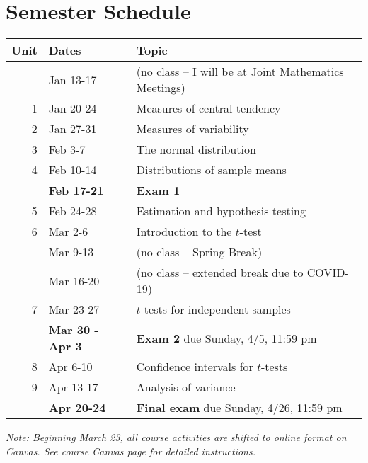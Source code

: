 \documentclass[10pt]{article}
\begin{document}
\section*{Semester Schedule}
\label{sec:orgac6aa8f}
\begin{center}
\begin{tabular}{rll}
Unit & Dates & Topic\\
\hline
 & Jan 13-17 & (no class -- I will be at Joint Mathematics Meetings)\\
1 & Jan 20-24 & Measures of central tendency\\
2 & Jan 27-31 & Measures of variability\\
3 & Feb 3-7 & The normal distribution\\
4 & Feb 10-14 & Distributions of sample means\\
 & \textbf{Feb 17-21} & \textbf{Exam 1}\\
5 & Feb 24-28 & Estimation and hypothesis testing\\
6 & Mar 2-6 & Introduction to the \(t\)-test\\
 & Mar 9-13 & (no class -- Spring Break)\\
 & Mar 16-20 & (no class -- extended break due to COVID-19)\\
7 & Mar 23-27 & \(t\)-tests for independent samples\\
 & \textbf{Mar 30 - Apr 3} & \textbf{Exam 2} due Sunday, 4/5, 11:59 pm\\
8 & Apr 6-10 & Confidence intervals for \(t\)-tests\\
9 & Apr 13-17 & Analysis of variance\\
 & \textbf{Apr 20-24} & \textbf{Final exam} due Sunday, 4/26, 11:59 pm\\
\end{tabular}
\end{center}

\emph{Note: Beginning March 23, all course activities are shifted to online format on Canvas. See course Canvas page for detailed instructions.}
\end{document}
